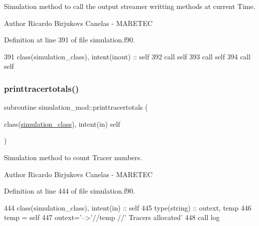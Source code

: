 Simulation method to call the output streamer writting methods at current Time. 

\begin{DoxyAuthor}{Author}
Ricardo Birjukovs Canelas -\/ M\+A\+R\+E\+T\+EC 
\end{DoxyAuthor}


Definition at line 391 of file simulation.\+f90.


\begin{DoxyCode}
391     \textcolor{keywordtype}{class}(simulation\_class), \textcolor{keywordtype}{intent(inout)} :: self
392     \textcolor{keyword}{call }self%
393     \textcolor{keyword}{call }self%
394     \textcolor{keyword}{call }self%
\end{DoxyCode}
\mbox{\label{namespacesimulation__mod_aba126a8e0575cabb3bef6ab395002b3c}} 
\subsubsection{\texorpdfstring{printtracertotals()}{printtracertotals()}}
{\footnotesize\ttfamily subroutine simulation\+\_\+mod\+::printtracertotals (\begin{DoxyParamCaption}\item[{class(\mbox{\hyperlink{structsimulation__mod_1_1simulation__class}{simulation\+\_\+class}}), intent(in)}]{self }\end{DoxyParamCaption})\hspace{0.3cm}{\ttfamily [private]}}



Simulation method to count Tracer numbers. 

\begin{DoxyAuthor}{Author}
Ricardo Birjukovs Canelas -\/ M\+A\+R\+E\+T\+EC 
\end{DoxyAuthor}


Definition at line 444 of file simulation.\+f90.


\begin{DoxyCode}
444     \textcolor{keywordtype}{class}(simulation\_class), \textcolor{keywordtype}{intent(in)} :: self
445     \textcolor{keywordtype}{type}(string) :: outext, temp
446     temp = self%
447     outext=\textcolor{stringliteral}{'-->'}//temp //\textcolor{stringliteral}{' Tracers allocated'}
448     \textcolor{keyword}{call }log%
\end{DoxyCode}
\mbox{\label{namespacesimulation__mod_a73bd78c4ac76c51f1e10f5847c25c4df}} 
